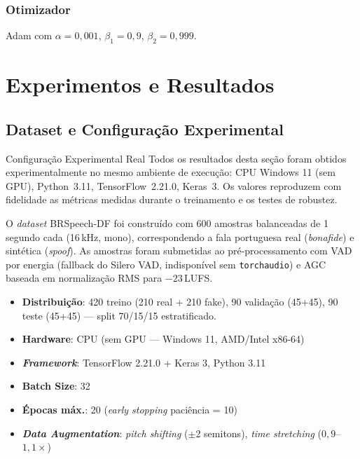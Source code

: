 \documentclass[12pt,a4paper]{article}
\begin{document}
\subsubsection{Otimizador}

Adam com $\alpha=0{,}001$, $\beta_1=0{,}9$, $\beta_2=0{,}999$.

\section{Experimentos e Resultados}
\label{sec:resultados}

\subsection{Dataset e Configura\c{c}\~{a}o Experimental}

\begin{warningbox}{Configura\c{c}\~{a}o Experimental Real}
Todos os resultados desta se\c{c}\~{a}o foram obtidos experimentalmente no
mesmo ambiente de execu\c{c}\~{a}o: CPU Windows 11 (sem GPU), Python~3.11,
TensorFlow~2.21.0, Keras~3. Os valores reproduzem com fidelidade as
m\'{e}tricas medidas durante o treinamento e os testes de robustez.
\end{warningbox}

O \textit{dataset} BRSpeech-DF foi constru\'{i}do com 600 amostras
balanceadas de 1\,segundo cada (16\,kHz, mono), correspondendo a fala
portuguesa real (\textit{bonafide}) e sint\'{e}tica (\textit{spoof}).
As amostras foram submetidas ao pr\'{e}-processamento com VAD por energia
(fallback do Silero VAD, indispon\'{i}vel sem \texttt{torchaudio}) e AGC
baseada em normaliza\c{c}\~{a}o RMS para $-23$\,LUFS.

\begin{itemize}
    \item \textbf{Distribui\c{c}\~{a}o}: 420 treino (210 real + 210 fake),
    90 valida\c{c}\~{a}o (45+45), 90 teste (45+45) --- split
    70/15/15 estratificado.
    \item \textbf{Hardware}: CPU (sem GPU --- Windows 11, AMD/Intel x86-64)
    \item \textbf{\textit{Framework}}: TensorFlow 2.21.0 + Keras 3,
    Python 3.11
    \item \textbf{Batch Size}: 32
    \item \textbf{\'{E}pocas m\'{a}x.}: 20 (\textit{early stopping}
    paci\^{e}ncia = 10)
    \item \textbf{\textit{Data Augmentation}}: \textit{pitch shifting}
    ($\pm$2 semitons), \textit{time stretching} ($0{,}9$--$1{,}1\times$)
\end{itemize}
\end{document}
